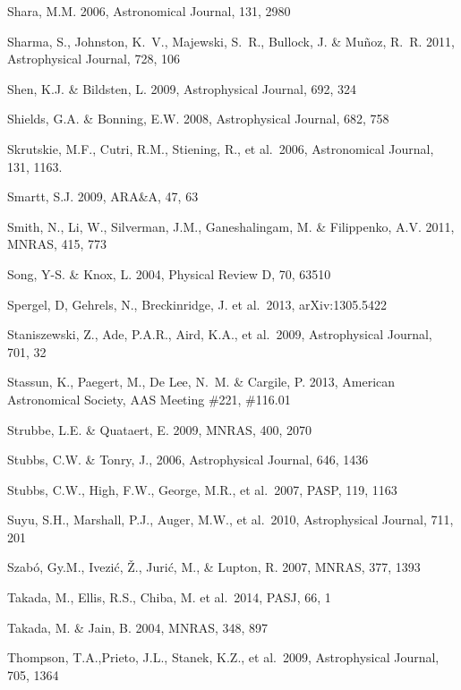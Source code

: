 \documentclass{emulateapj}
\begin{document}
\begin{thebibliography}{}
\bibitem[()]{} Shara, M.M. 2006, Astronomical Journal, 131, 2980

\bibitem[()]{} Sharma, S., Johnston, K.~V., Majewski, S.~R., Bullock, J. \& Mu{\~n}oz, R.~R. 2011,  
                      Astrophysical Journal, 728, 106

\bibitem[()]{} Shen, K.J. \& Bildsten, L. 2009, Astrophysical Journal, 692, 324

\bibitem[()]{} Shields, G.A. \& Bonning, E.W. 2008, Astrophysical Journal, 682, 758 

\bibitem[()]{} Skrutskie, M.F., Cutri, R.M., Stiening, R., et al.~2006, Astronomical Journal, 131, 1163.

\bibitem[()]{} Smartt, S.J. 2009, ARA\&A, 47, 63

\bibitem[()]{} Smith, N., Li, W., Silverman, J.M., Ganeshalingam, M. \& Filippenko, A.V. 2011, MNRAS, 415, 773

\bibitem[()]{} Song, Y-S. \& Knox, L. 2004, Physical Review D, 70, 63510

\bibitem[()]{} Spergel, D, Gehrels, N., Breckinridge, J. et al.~2013, arXiv:1305.5422


\bibitem[()]{} Staniszewski, Z., Ade, P.A.R., Aird, K.A., et al.~2009,  Astrophysical  Journal, 701, 32

\bibitem[()]{} Stassun, K., Paegert, M., De Lee, N.~M. \& Cargile, P. 2013, American Astronomical Society, 
                      AAS Meeting \#221, \#116.01

\bibitem[()]{} Strubbe, L.E. \& Quataert, E. 2009, MNRAS, 400, 2070

\bibitem[()]{} Stubbs, C.W. \& Tonry, J., 2006, Astrophysical Journal, 646, 1436

\bibitem[()]{} Stubbs, C.W., High, F.W., George, M.R., et al.~2007, PASP, 119, 1163 

\bibitem[()]{} Suyu, S.H., Marshall, P.J., Auger, M.W., et al.~2010, Astrophysical Journal, 711, 201

\bibitem[()]{} Szab\'o, Gy.M., Ivezi\'c, \v{Z}., Juri\'c, M., \& Lupton, R. 2007, MNRAS, 377, 1393

\bibitem[()]{} Takada, M., Ellis, R.S., Chiba, M. et al.~2014, PASJ,
  66, 1

\bibitem[()]{} Takada, M. \& Jain, B. 2004, MNRAS, 348, 897

\bibitem[()]{} Thompson, T.A.,Prieto, J.L., Stanek, K.Z., et al.~2009, Astrophysical Journal, 705, 1364


\end{thebibliography}
\end{document}
